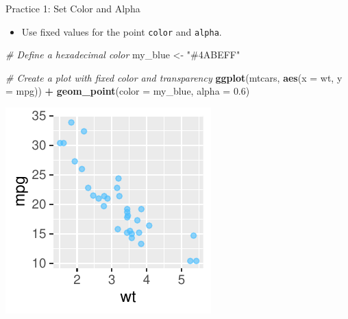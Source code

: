 \documentclass[
  ignorenonframetext,
]{beamer}
\newenvironment{Shaded}{\begin{snugshade}}{\end{snugshade}}
\newcommand{\AttributeTok}[1]{\textcolor[rgb]{0.13,0.29,0.53}{#1}}
\newcommand{\CommentTok}[1]{\textcolor[rgb]{0.56,0.35,0.01}{\textit{#1}}}
\newcommand{\FloatTok}[1]{\textcolor[rgb]{0.00,0.00,0.81}{#1}}
\newcommand{\FunctionTok}[1]{\textcolor[rgb]{0.13,0.29,0.53}{\textbf{#1}}}
\newcommand{\NormalTok}[1]{#1}
\newcommand{\OtherTok}[1]{\textcolor[rgb]{0.56,0.35,0.01}{#1}}
\newcommand{\SpecialCharTok}[1]{\textcolor[rgb]{0.81,0.36,0.00}{\textbf{#1}}}
\newcommand{\StringTok}[1]{\textcolor[rgb]{0.31,0.60,0.02}{#1}}
\providecommand{\tightlist}{%
  \setlength{\itemsep}{0pt}\setlength{\parskip}{0pt}}
\begin{document}
\begin{frame}[fragile]{Practice 1: Set Color and Alpha}
\label{practice-1-set-color-and-alpha}
\begin{itemize}
\tightlist
\item
  Use fixed values for the point \texttt{color} and \texttt{alpha}.
\end{itemize}


\begin{Shaded}
\begin{Highlighting}[]
\CommentTok{\# Define a hexadecimal color}
\NormalTok{my\_blue }\OtherTok{\textless{}{-}} \StringTok{"\#4ABEFF"}

\CommentTok{\# Create a plot with fixed color and transparency}
\FunctionTok{ggplot}\NormalTok{(mtcars, }\FunctionTok{aes}\NormalTok{(}\AttributeTok{x =}\NormalTok{ wt, }\AttributeTok{y =}\NormalTok{ mpg)) }\SpecialCharTok{+} \FunctionTok{geom\_point}\NormalTok{(}\AttributeTok{color =}\NormalTok{ my\_blue,}
    \AttributeTok{alpha =} \FloatTok{0.6}\NormalTok{)}
\end{Highlighting}
\end{Shaded}

\begin{center}\includegraphics[width=0.5\linewidth]{Figs/unnamed-chunk-21-1} \end{center}
\end{frame}
\end{document}

